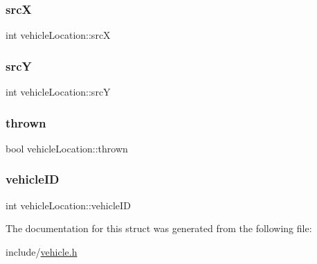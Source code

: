 \hypertarget{structvehicle_location_a89558db4d4c00dc425fe0e5a7ff56cab}{}\label{structvehicle_location_a89558db4d4c00dc425fe0e5a7ff56cab} 
\subsubsection{\texorpdfstring{srcX}{srcX}}
{\footnotesize\ttfamily int vehicle\+Location\+::srcX}

\hypertarget{structvehicle_location_ac2038a17b0a32d5b4485c0a8bb61a954}{}\label{structvehicle_location_ac2038a17b0a32d5b4485c0a8bb61a954} 
\subsubsection{\texorpdfstring{srcY}{srcY}}
{\footnotesize\ttfamily int vehicle\+Location\+::srcY}

\hypertarget{structvehicle_location_af71ecab56cec29c594fb46d1bb14db16}{}\label{structvehicle_location_af71ecab56cec29c594fb46d1bb14db16} 
\subsubsection{\texorpdfstring{thrown}{thrown}}
{\footnotesize\ttfamily bool vehicle\+Location\+::thrown}

\hypertarget{structvehicle_location_a70065ae251ef62afa90db7325f61de5d}{}\label{structvehicle_location_a70065ae251ef62afa90db7325f61de5d} 
\subsubsection{\texorpdfstring{vehicle\+ID}{vehicleID}}
{\footnotesize\ttfamily int vehicle\+Location\+::vehicle\+ID}



The documentation for this struct was generated from the following file\+:\begin{DoxyCompactItemize}
\item 
include/\hyperlink{vehicle_8h}{vehicle.\+h}\end{DoxyCompactItemize}
